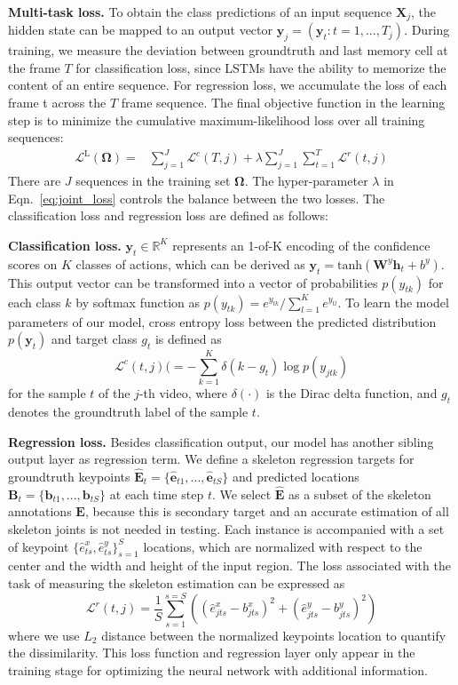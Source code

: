 \documentclass[10pt,twocolumn,letterpaper]{article}
\begin{document}
\noindent \textbf{Multi-task loss.} To obtain the class predictions of an input sequence $\bm{X}_j$, the hidden state can be mapped to an output vector $\bm{y}_j=(\bm{y}_t: t=1,...,T_j)$. During training, we measure the deviation between groundtruth and last memory cell at the frame $T$ for classification loss, since LSTMs have the ability to memorize the content of an entire sequence. For regression loss, we accumulate the loss of each frame t across the $T$ frame sequence. The final objective function in the learning step is to minimize the cumulative maximum-likelihood loss over all training sequences:
\vspace{-0.05cm}
\begin{align}
\mathcal{L}^{\mathrm{L}}(\bm{\Omega})=&
\sum_{j=1}^{J}\mathcal{L}^{c}(T,j)+ \lambda \sum_{j=1}^{J}\sum_{t=1}^{T}\mathcal{L}^{r}(t,j)\label{eq:joint_loss}
\end{align}
There are $J$ sequences in the training set $\bm{\Omega}$.
The hyper-parameter $\lambda$ in Eqn.~\ref{eq:joint_loss} controls the balance between the two losses. The classification loss and regression loss are defined as follows:



\noindent \textbf{Classification loss.}  $\bm{y}_t \in \mathbb{R}^K$ represents an 1-of-K encoding of the confidence scores on $K$ classes of actions, which can be derived as  $\bm{y}_{t}=\mathrm{tanh}(\bm{W}^{y}\bm{h}_{t}+b^{y})$. This output vector can be transformed into a vector of probabilities $p(y_{tk})$ for each class $k$ by softmax function as $p(y_{tk})=e^{y_{tk}}/\sum_{l=1}^{K}e^{y_{tl}}$. To learn the model parameters of our model, cross entropy loss between the predicted distribution $p(\bm{y}_{t})$ and target class $g_t$ is defined as
$$\mathcal{L}^{c}(t,j)( =- \sum_{k=1}^{K} \delta (k-g_t)\log p(y_{jtk})$$ for the sample $t$ of the $j$-th video,
where $\delta(\cdot)$ is the Dirac delta function, and $g_t$ denotes the groundtruth label of the sample $t$.


\noindent \textbf{Regression loss.} Besides classification output, our model has another sibling output layer as regression term. We define a skeleton regression targets for groundtruth keypoints $\hat{\bm{E}}_t=\{ \hat{\bm{e}}_{t1},...,\hat{\bm{e}}_{tS} \}$  and predicted locations $\bm{B}_t=\{\bm{b}_{t1},...,\bm{b}_{tS}\}$ at each time step $t$. We select $\hat{\bm{E}}$ as a subset of the skeleton annotations $\bm{E}$,  because this is secondary target and an accurate estimation of all skeleton joints is not needed in testing. Each instance is accompanied with a set of keypoint $\{\hat{e}^x_{ts}, \hat{e}^y_{ts}\}_{s=1}^S$ locations, which are normalized with respect to the center and the width and height of the input region. The loss associated with the task of measuring the skeleton estimation can be expressed as
$$\mathcal{L}^{r}(t,j)=\frac{1}{S}\sum_{s=1}^{s=S}((\hat{e}^x_{jts}-b^x_{jts})^2+(\hat{e}^y_{jts}-b^y_{jts})^2)$$
where we use $L_2$ distance between the normalized keypoints location to quantify the dissimilarity. This loss function and regression layer only appear in the training stage for optimizing the neural network with additional information.
\end{document}

